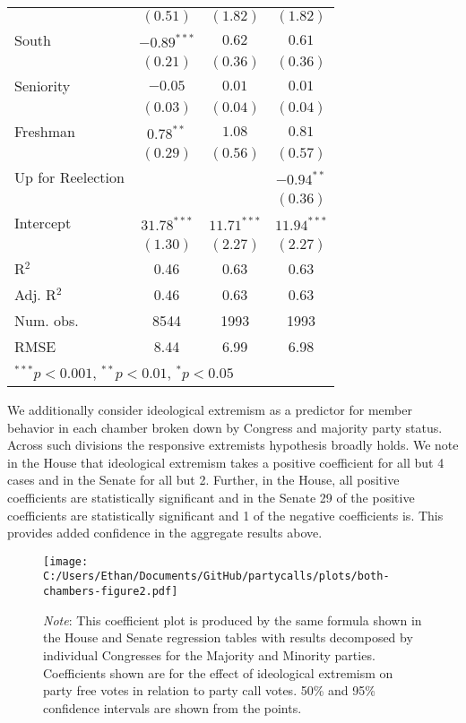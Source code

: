 \documentclass[12pt]{article}
\newcommand\fnote[1]{\captionsetup{font=small}\caption*{#1}}
\begin{document}
\begin{table}[H]
\begin{center}
\begin{tabular}{l c c c }
			& $(0.51)$      & $(1.82)$      & $(1.82)$      \\
			South                  & $-0.89^{***}$ & $0.62$        & $0.61$        \\
			& $(0.21)$      & $(0.36)$      & $(0.36)$      \\
			Seniority              & $-0.05$       & $0.01$        & $0.01$        \\
			& $(0.03)$      & $(0.04)$      & $(0.04)$      \\
			Freshman               & $0.78^{**}$   & $1.08$        & $0.81$        \\
			& $(0.29)$      & $(0.56)$      & $(0.57)$      \\
			Up for Reelection    &               &               & $-0.94^{**}$  \\
			&               &               & $(0.36)$      \\
			Intercept            & $31.78^{***}$ & $11.71^{***}$ & $11.94^{***}$ \\
			& $(1.30)$      & $(2.27)$      & $(2.27)$      \\
			\hline
			R$^2$                  & 0.46          & 0.63          & 0.63          \\
			Adj. R$^2$             & 0.46          & 0.63          & 0.63          \\
			Num. obs.              & 8544          & 1993          & 1993          \\
			RMSE                   & 8.44          & 6.99          & 6.98          \\
			\hline
			\multicolumn{4}{l}{\scriptsize{$^{***}p<0.001$, $^{**}p<0.01$, $^*p<0.05$}}
		\end{tabular}
	\fnote{\textit{}}
	\end{center}
\end{table}

We additionally consider ideological extremism as a predictor for member behavior in each chamber broken down by Congress and majority party status. Across such divisions the responsive extremists hypothesis broadly holds. We note in the House that ideological extremism takes a positive coefficient for all but 4 cases and in the Senate for all but 2. Further, in the House, all positive coefficients are statistically significant and in the Senate 29 of the positive coefficients are statistically significant and 1 of the negative coefficients is. This provides added confidence in the aggregate results above.

\begin{figure}[H]
	\centering
	\caption{Ideology and Responsiveness to Party Calls, Congresses 93-112}
	\texttt{[image: C:/Users/Ethan/Documents/GitHub/partycalls/plots/both-chambers-figure2.pdf]}
	\fnote{\textit{Note}: This coefficient plot is produced by the same formula shown in the House and Senate regression tables with results decomposed by individual Congresses for the Majority and Minority parties. Coefficients shown are for the effect of ideological extremism on party free votes in relation to party call votes. 50\% and 95\% confidence intervals are shown from the points.}
\end{figure} 
\end{document}
